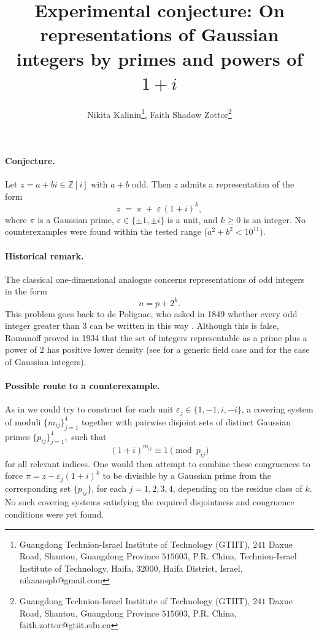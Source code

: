 \documentclass[11pt]{article}
\title{Experimental conjecture: On representations of Gaussian integers by primes and powers of $1+i$}
\author{Nikita Kalinin\footnote{Guangdong Technion-Israel Institute of Technology (GTIIT),
$241$ Daxue Road, Shantou, Guangdong Province $515603$, P.R. China, Technion-Israel Institute of Technology, Haifa, 32000, Haifa District, Israel, nikaanspb@gmail.com}, Faith Shadow Zottor\footnote{Guangdong Technion-Israel Institute of Technology (GTIIT),
$241$ Daxue Road, Shantou, Guangdong Province $515603$, P.R. China, faith.zottor@gtiit.edu.cn}}
\begin{document}
\maketitle
\vspace{-1cm}

\paragraph{Conjecture.}
Let $z=a+bi\in\mathbb{Z}[i]$ with $a+b$ odd.  
Then $z$ admits a representation of the form
\[
z \;=\; \pi \;+\; \varepsilon\,(1+i)^k,
\]
where $\pi$ is a Gaussian prime, $\varepsilon\in\{\pm1,\pm i\}$ is a unit,
and $k\ge0$ is an integer. No counterexamples were found within the tested range ($a^2+b^2<10^{11}$).

\paragraph{Historical remark.}
The classical one-dimensional analogue concerns representations of odd integers in the form
\[
n = p+2^k.
\]
This problem goes back to de Polignac, who asked in 1849 whether every odd integer greater than $3$ can be written in this way \cite{depolignac1849}. Although this is false, Romanoff proved in 1934 that the set of integers representable as a prime plus a power of $2$ has positive lower density \cite{romanoff1934} (see \cite{Rieger1961} for a generic field case and \cite{MadritschPlanitzer2017} for the case of Gaussian integers).

\paragraph{Possible route to a counterexample.}
As in \cite{erdos1950integers,sun2002integers} we could try to construct for each unit
$\varepsilon_j \in\{ 1,-1, i, -i\}$, a covering system of moduli
\(
\{m_{i j}\}_{j=1}^4
\)
together with pairwise disjoint sets of distinct Gaussian primes
\(
\{p_{i j}\}_{j=1}^4,
\)
such that
\[
(1+i)^{m_{i j}} \equiv 1 \pmod{p_{i j}}
\]
for all relevant indices. One would then attempt to combine these congruences
to force $\pi = z - \varepsilon_j(1+i)^k$ to be divisible by a Gaussian prime
from the corresponding set $\{p_{i j}\}$, for each $j=1,2,3,4$, depending on the residue class of $k$. No such covering systems satisfying the required disjointness and congruence conditions were yet found.
\end{document}
